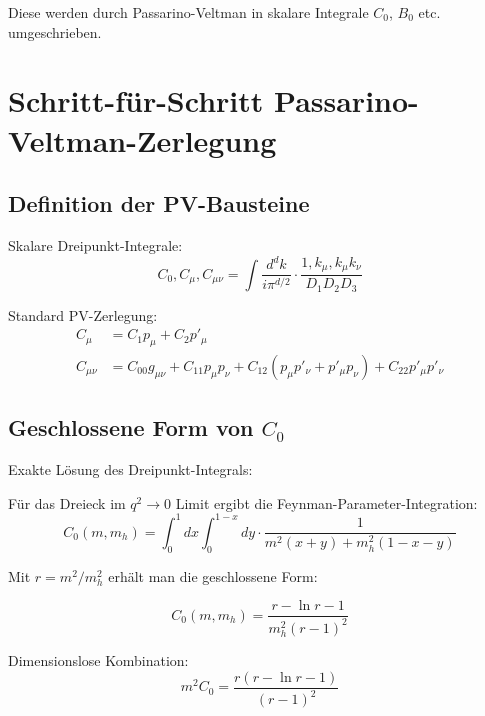 	Diese werden durch Passarino-Veltman in skalare Integrale $C_0$, $B_0$ etc. umgeschrieben.
	
	\section{Schritt-für-Schritt Passarino-Veltman-Zerlegung}
	
	\subsection{Definition der PV-Bausteine}
	
	\begin{pvbox}
		Skalare Dreipunkt-Integrale:
		\begin{equation}
			C_0, C_\mu, C_{\mu\nu} = \int \frac{d^d k}{i\pi^{d/2}} \cdot \frac{1, k_\mu, k_\mu k_\nu}{D_1 D_2 D_3}
		\end{equation}
		
		Standard PV-Zerlegung:
		\begin{align}
			C_\mu &= C_1 p_\mu + C_2 p'_\mu\\
			C_{\mu\nu} &= C_{00} g_{\mu\nu} + C_{11} p_\mu p_\nu + C_{12}(p_\mu p'_\nu + p'_\mu p_\nu) + C_{22} p'_\mu p'_\nu
		\end{align}
	\end{pvbox}
	
	\subsection{Geschlossene Form von $C_0$}
	
	\begin{pvbox}
		Exakte Lösung des Dreipunkt-Integrals:
		
		Für das Dreieck im $q^2 \to 0$ Limit ergibt die Feynman-Parameter-Integration:
		\begin{equation}
			C_0(m, m_h) = \int_0^1 dx \int_0^{1-x} dy \cdot \frac{1}{m^2(x+y) + m_h^2(1-x-y)}
		\end{equation}
		
		Mit $r = m^2/m_h^2$ erhält man die geschlossene Form:
		
		\begin{equation}
			C_0(m, m_h) = \frac{r - \ln r - 1}{m_h^2(r-1)^2}
		\end{equation}
		
		Dimensionslose Kombination:
		\begin{equation}
			m^2C_0 = \frac{r(r - \ln r - 1)}{(r-1)^2}
		\end{equation}
	\end{pvbox}
	
